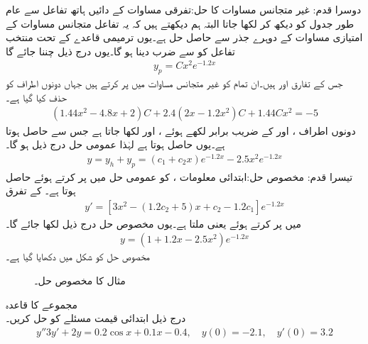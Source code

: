 دوسرا قدم: غیر متجانس مساوات کا حل:\quad تفرقی مساوات کے دائیں ہاتھ تفاعل  سے عام طور جدول  کو دیکھ کر  لکھا جاتا البتہ ہم دیکھتے ہیں کہ یہ تفاعل متجانس مساوات کے امتیازی مساوات کے دوہرے جذر سے حاصل حل ہے۔یوں ترمیمی قاعدے کے تحت منتخب تفاعل کو  سے ضرب دینا ہو گا۔یوں درج ذیل چننا جائے گا
\begin{align*}
y_p=Cx^2e^{-1.2x}
\end{align*}
جس کے تفارق  اور  ہیں۔ان تمام  کو غیر متجانس مساوات میں پر کرتے ہیں جہاں دونوں اطراف  کو حذف کیا گیا ہے۔
\begin{align*}
(1.44x^2-4.8x+2)C+2.4(2x-1.2x^2)C+1.44Cx^2=-5
\end{align*}
دونوں اطراف ،  اور  کے  ضریب  برابر لکھے ہوئے ،  اور  لکھا جاتا ہے جس سے  حاصل ہوتا ہے۔یوں  حاصل ہوتا ہے لہٰذا عمومی حل درج ذیل ہو گا۔
 \begin{align*}
y=y_h+y_p=(c_1+c_2x)e^{-1.2x}-2.5x^2e^{-1.2x}
\end{align*}
تیسرا قدم: مخصوص حل:\quad ابتدائی معلومات ،   کو عمومی حل میں پر کرتے ہوئے  حاصل ہوتا ہے۔ کے تفرق
\begin{align*}
y'=[3x^2-(1.2c_2+5)x+c_2-1.2c_1]e^{-1.2x}
\end{align*} 
 میں  پر کرتے  ہوئے  یعنی  ملتا ہے۔یوں مخصوص حل درج ذیل لکھا جائے گا۔
\begin{align*}
y=(1+1.2x-2.5x^2)e^{-1.2x}
\end{align*}
مخصوص حل کو شکل  میں دکھایا گیا ہے۔
\begin{figure}
\centering
{}
\caption{مثال  کا مخصوص حل۔}
\label{شکل_مثال_سادہ_دو_نا_معلوم_سر_ب}
\end{figure}
\quad مجموعے کا قاعدہ\\
درج ذیل ابتدائی قیمت مسئلے کو حل کریں۔
\begin{align*}
y''3y'+2y=0.2\cos x+0.1x-0.4, \quad y(0)=-2.1, \quad y'(0)=3.2
\end{align*}

